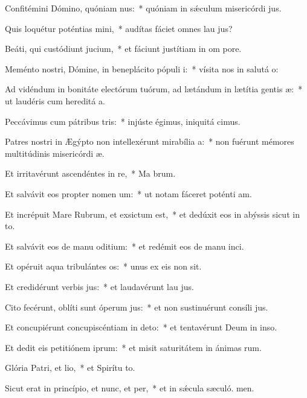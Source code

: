 \item Confitémini Dómino, quóniam nus:~* quóniam in sǽculum misericórdi jus.
\item Quis loquétur poténtias mini,~* audítas fáciet omnes lau jus?
\item Beáti, qui custódiunt jucium,~* et fáciunt justítiam in om pore.
\item Meménto nostri, Dómine, in beneplácito pópuli i:~* vísita nos in salutá o:
\item Ad vidéndum in bonitáte electórum tuórum, ad lætándum in lætítia gentis æ:~* ut laudéris cum hereditá a.
\item Peccávimus cum pátribus tris:~* injúste égimus, iniquitá cimus.
\item Patres nostri in Ægýpto non intellexérunt mirabília a:~* non fuérunt mémores multitúdinis misericórdi æ.
\item Et irritavérunt ascendéntes in re,~* Ma brum.
\item Et salvávit eos propter nomen um:~* ut notam fáceret poténti am.
\item Et incrépuit Mare Rubrum, et exsictum est,~* et dedúxit eos in abýssis sicut in to.
\item Et salvávit eos de manu oditium:~* et redémit eos de manu inci.
\item Et opéruit aqua tribulántes os:~* unus ex eis non sit.
\item Et credidérunt verbis jus:~* et laudavérunt lau jus.
\item Cito fecérunt, oblíti sunt óperum jus:~* et non sustinuérunt consíli jus.
\item Et concupiérunt concupiscéntiam in deto:~* et tentavérunt Deum in inso.
\item Et dedit eis petitiónem iprum:~* et misit saturitátem in ánimas rum.
\item Glória Patri, et lio,~* et Spirítu to.
\item Sicut erat in princípio, et nunc, et per,~* et in sǽcula sæculó. men.
